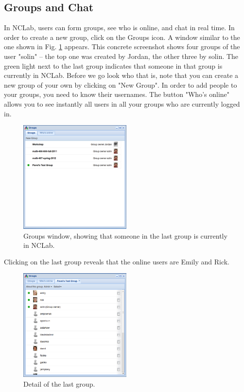 \documentclass[article,A4,12pt]{llncs}
\begin{document}
\subsection{Groups and Chat}

In NCLab, users can form groups, see who is online, and chat in real time. In order to 
create a new group, click on the Groups icon. A window similar to the one shown 
in Fig. \ref{fig:groups} appears. This concrete screenshot shows four groups of the 
user "solin" -- the top one was created by Jordan, the other three by solin. The 
green light next to the last group indicates that someone in that group
is currently in NCLab. Before we go look who that is, note that you can create a
new group of your own by clicking on "New Group". In order to add people to your groups,
you need to know their usernames. The button "Who's online" allows you to see instantly 
all users in all your groups who are currently logged in. 

\begin{figure}[!ht]
\begin{center}
\includegraphics[width=0.5\textwidth]{img/groups.png}
\end{center}
\caption{Groups window, showing that someone in the last group is currently in NCLab.}
\label{fig:groups}
\end{figure}

\newpage
\noindent
Clicking on the last group 
reveals that the online users are Emily and Rick.
\begin{figure}[!ht]
\begin{center}
\includegraphics[width=0.5\textwidth]{img/groups-2.png}
\end{center}
\caption{Detail of the last group.}
\label{fig:groups-2}
\end{figure}
\end{document}
